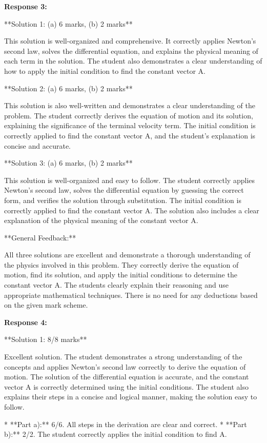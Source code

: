 \documentclass[a4paper,11pt]{article}
\begin{document}
\bigskip    
\textbf{Response 3:}

**Solution 1: (a) 6 marks, (b) 2 marks**

This solution is well-organized and comprehensive. It correctly applies Newton's second law, solves the differential equation, and explains the physical meaning of each term in the solution. The student also demonstrates a clear understanding of how to apply the initial condition to find the constant vector A.

**Solution 2: (a) 6 marks, (b) 2 marks**

This solution is also well-written and demonstrates a clear understanding of the problem. The student correctly derives the equation of motion and its solution, explaining the significance of the terminal velocity term. The initial condition is correctly applied to find the constant vector A, and the student's explanation is concise and accurate.

**Solution 3: (a) 6 marks, (b) 2 marks**

This solution is well-organized and easy to follow. The student correctly applies Newton's second law, solves the differential equation by guessing the correct form, and verifies the solution through substitution. The initial condition is correctly applied to find the constant vector A. The solution also includes a clear explanation of the physical meaning of the constant vector A.

**General Feedback:**

All three solutions are excellent and demonstrate a thorough understanding of the physics involved in this problem. They correctly derive the equation of motion, find its solution, and apply the initial conditions to determine the constant vector A. The students clearly explain their reasoning and use appropriate mathematical techniques. There is no need for any deductions based on the given mark scheme.

\textbf{Response 4:}

**Solution 1: 8/8 marks**

Excellent solution. The student demonstrates a strong understanding of the concepts and applies Newton's second law correctly to derive the equation of motion. The solution of the differential equation is accurate, and the constant vector A is correctly determined using the initial conditions. The student also explains their steps in a concise and logical manner, making the solution easy to follow.

*   **Part a):** 6/6. All steps in the derivation are clear and correct.
*   **Part b):** 2/2. The student correctly applies the initial condition to find A.
\end{document}
